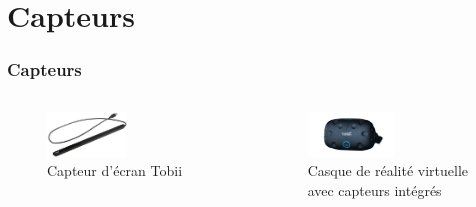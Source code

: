 \documentclass{beamer}
\begin{document}
\section{Capteurs}
\begin{frame}
  \frametitle{Capteurs}

  \begin{columns}
    \begin{figure}
      \includegraphics[height=0.35\textwidth]{tobii.jpeg}
      \caption{Capteur d'écran Tobii}
    \end{figure}
    \begin{figure}
      \includegraphics[height=0.35\textwidth]{htcvive.png}
      \caption{Casque de réalité virtuelle avec capteurs intégrés}
    \end{figure}
  \end{columns}
\end{frame}
\end{document}
